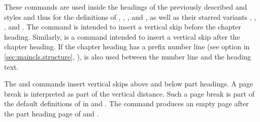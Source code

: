 \begin{Declaration}
\end{Declaration}
These commands are used inside the headings of the
previously described  and  styles and thus for
the definitions of ,
,
, and
, as well as their starred
variants ,
,
, and
. 
The  command is intended to insert a
vertical skip before the chapter heading. Similarly,
 is a command intended to insert a vertical
skip after the chapter heading. If the chapter heading has a prefix number line (see option
 in \autoref{sec:maincls.structure},
), 
is also used between the number line and the heading text.

The  and  commands insert
vertical skips above and below part headings. A page break is interpreted as
part of the vertical distance. Such a page break is part of the default
definitions of  in
 and
. The
 command produces an empty page after the part heading page
of  and .

